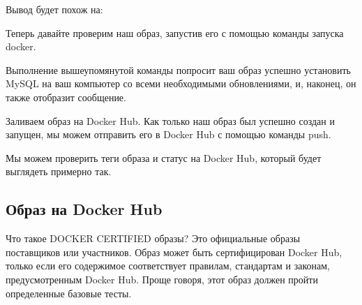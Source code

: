\documentclass[letterpaper,10pt,russian]{sphinxmanual}
\begin{document}
\sphinxAtStartPar
Вывод будет похож на:

\sphinxAtStartPar
{}

\sphinxAtStartPar
Теперь давайте проверим наш образ, запустив его с помощью команды запуска docker.

\sphinxAtStartPar
{}

\sphinxAtStartPar
Выполнение вышеупомянутой команды попросит ваш  образ успешно установить MySQL на ваш компьютер со всеми необходимыми обновлениями, и, наконец, он также отобразит сообщение.

\sphinxAtStartPar
Заливаем образ на Docker Hub. Как только наш образ был успешно создан и запущен, мы можем отправить его в Docker Hub с помощью команды push.

\sphinxAtStartPar
{}

\sphinxAtStartPar
Мы можем проверить теги образа и статус на Docker Hub, который будет выглядеть примерно так.

\sphinxAtStartPar
{}


\subsection{Образ на Docker Hub}
\label{\detokenize{educational_materials/docker_hub/content:docker-hub}}
\sphinxAtStartPar
Что такое DOCKER CERTIFIED образы?
Это официальные образы поставщиков или участников. Образ может быть сертифицирован Docker Hub, только если его содержимое соответствует правилам, стандартам и законам, предусмотренным Docker Hub. Проще говоря, этот образ должен пройти определенные базовые тесты.
\end{document}
